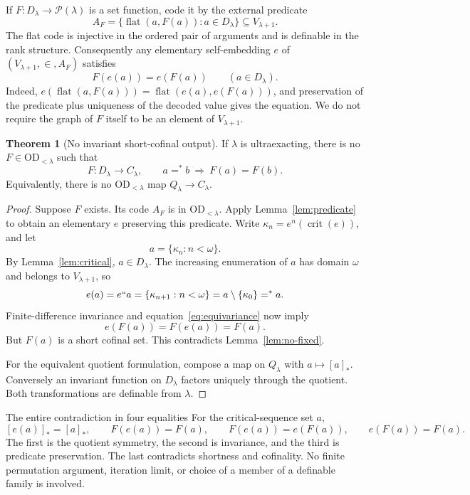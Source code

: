 \documentclass[11pt,letterpaper]{article}
\theoremstyle{definition}
\newtheorem{theorem}[definition]{Theorem}
\numberwithin{equation}{section}
\newcommand{\OD}{\mathrm{OD}}
\newcommand{\crit}{\operatorname{crit}}
\newcommand{\Pow}{\mathcal P}
\newcommand{\Dlam}{D_\lambda}
\newcommand{\Qlam}{Q_\lambda}
\newcommand{\Clam}{C_\lambda}
\newcommand{\ODlo}{\OD_{<\lambda}}
\newcommand{\flatcode}[2]{\operatorname{flat}(#1,#2)}
\newcommand{\qclass}[1]{[#1]_{*}}
\newcommand{\same}{\mathrel{=^{*}}}
\begin{document}
If $F:\Dlam\to\Pow(\lambda)$ is a set function, code it by the external predicate
\begin{equation}\label{eq:graphcode}
A_F=\{\flatcode{a}{F(a)}:a\in\Dlam\}\subseteq V_{\lambda+1}.
\end{equation}
The flat code is injective in the ordered pair of arguments and is definable in the rank structure. Consequently any elementary self-embedding $e$ of $(V_{\lambda+1},\in,A_F)$ satisfies
\begin{equation}\label{eq:equivariance}
F(e(a))=e(F(a))\qquad(a\in\Dlam).
\end{equation}
Indeed, $e(\flatcode{a}{F(a)})=\flatcode{e(a)}{e(F(a))}$, and preservation of the predicate plus uniqueness of the decoded value gives the equation. We do not require the graph of $F$ itself to be an element of $V_{\lambda+1}$.

\begin{theorem}[No invariant short-cofinal output]\label{thm:kernel}
If $\lambda$ is ultraexacting, there is no $F\in\ODlo$ such that
\[
F:\Dlam\longrightarrow\Clam,
\qquad
 a\same b\ \Longrightarrow\ F(a)=F(b).
\]
Equivalently, there is no $\ODlo$ map $\Qlam\to\Clam$.
\end{theorem}

\begin{proof}
Suppose $F$ exists. Its code $A_F$ is in $\ODlo$. Apply Lemma~\ref{lem:predicate} to obtain an elementary $e$ preserving this predicate. Write $\kappa_n=e^n(\crit(e))$, and let
\[
a=\{\kappa_n:n<\omega\}.
\]
By Lemma~\ref{lem:critical}, $a\in\Dlam$. The increasing enumeration of $a$ has domain $\omega$ and belongs to $V_{\lambda+1}$, so
\[
e(a)=e``a=\{\kappa_{n+1}:n<\omega\}
=a\setminus\{\kappa_0\}\same a.
\]
Finite-difference invariance and equation~\eqref{eq:equivariance} now imply
\[
e(F(a))=F(e(a))=F(a).
\]
But $F(a)$ is a short cofinal set. This contradicts Lemma~\ref{lem:no-fixed}.

For the equivalent quotient formulation, compose a map on $\Qlam$ with $a\mapsto\qclass a$. Conversely an invariant function on $\Dlam$ factors uniquely through the quotient. Both transformations are definable from $\lambda$.
\end{proof}

\begin{assessment}{The entire contradiction in four equalities}
For the critical-sequence set $a$,
\[
\qclass{e(a)}=\qclass a,
\qquad F(e(a))=F(a),
\qquad F(e(a))=e(F(a)),
\qquad e(F(a))=F(a).
\]
The first is the quotient symmetry, the second is invariance, and the third is predicate preservation. The last contradicts shortness and cofinality. No finite permutation argument, iteration limit, or choice of a member of a definable family is involved.
\end{assessment}
\end{document}
